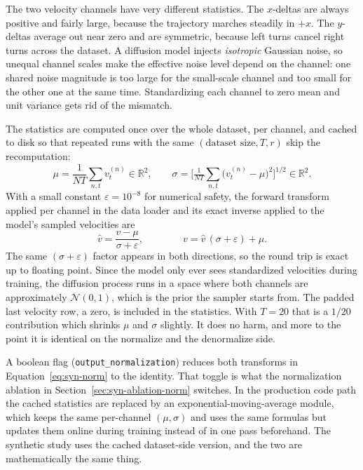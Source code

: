 The two velocity channels have very different statistics. The $x$-deltas are
always positive and fairly large, because the trajectory marches steadily in
$+x$. The $y$-deltas average out near zero and are symmetric, because left turns
cancel right turns across the dataset. A diffusion model injects
\emph{isotropic} Gaussian noise, so unequal channel scales make the effective
noise level depend on the channel: one shared noise magnitude is too large for
the small-scale channel and too small for the other one at the same time.
Standardizing each channel to zero mean and unit variance gets rid of the
mismatch.

The statistics are computed once over the whole dataset, per channel, and cached
to disk so that repeated runs with the same $(\text{dataset size},T,r)$ skip the
recomputation:
\begin{equation}
\mu = \frac{1}{NT}\sum_{n,t} v^{(n)}_t \in \mathbb{R}^2,
\qquad
\sigma = \Big[\tfrac{1}{NT}\sum_{n,t}\big(v^{(n)}_t-\mu\big)^2\Big]^{1/2}
\in \mathbb{R}^2.
\label{eq:syn-stats}
\end{equation}
With a small constant $\varepsilon=10^{-8}$ for numerical safety, the forward
transform applied per channel in the data loader and its exact inverse applied to
the model's sampled velocities are
\begin{equation}
\hat v = \frac{v-\mu}{\sigma+\varepsilon},
\qquad\qquad
v = \hat v\,(\sigma+\varepsilon) + \mu.
\label{eq:syn-norm}
\end{equation}
The same $(\sigma+\varepsilon)$ factor appears in both directions, so the round
trip is exact up to floating point. Since the model only ever sees standardized
velocities during training, the diffusion process runs in a space where both
channels are approximately $\mathcal{N}(0,1)$, which is the prior the sampler
starts from. The padded last velocity row, a zero, is included in the
statistics. With $T=20$ that is a $1/20$ contribution which shrinks $\mu$ and
$\sigma$ slightly. It does no harm, and more to the point it is identical on the
normalize and the denormalize side.

A boolean flag (\texttt{output\_normalization}) reduces both transforms in
Equation~\eqref{eq:syn-norm} to the identity. That toggle is what the
normalization ablation in Section~\ref{sec:syn-ablation-norm} switches. In the
production code path the cached statistics are replaced by an
exponential-moving-average module, which keeps the same per-channel
$(\mu,\sigma)$ and uses the same formulas but updates them online during training
instead of in one pass beforehand. The synthetic study uses the cached
dataset-side version, and the two are mathematically the same thing.

